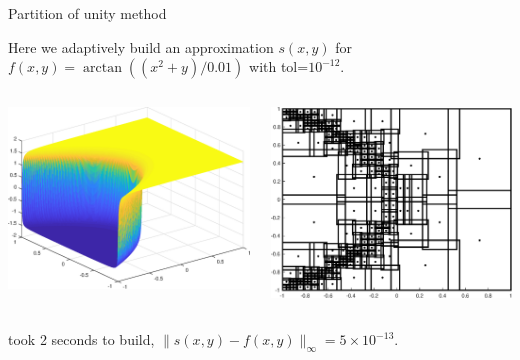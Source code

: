\documentclass{beamer}
\newcommand{\lp}{\left(}
\newcommand{\rp}{\right)}
\begin{document}
\begin{frame}{Partition of unity method}

Here we adaptively build an approximation $s(x,y)$ for $f(x,y) = \arctan \lp \lp x^2+y \rp/0.01 \rp$ with tol=$10^{-12}$.
\bigskip

\begin{columns}[t]

\begin{column}{0.5\textwidth}	
\begin{center}
\includegraphics[scale = 0.3]{tan2Dplot.eps}	
\end{center}
\end{column}

\begin{column}{0.5\textwidth}
\begin{center}
\includegraphics[scale = 0.3]{tan2Dsubdomains.eps}	
\end{center}
\end{column}

\end{columns}

\begin{center}
took 2 seconds to build, $\| s(x,y)-f(x,y)\|_{\infty} = 5\times10^{-13}$.	
\end{center}

\end{frame}
\end{document}
